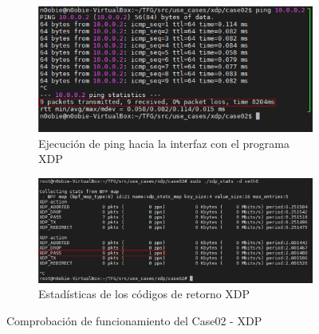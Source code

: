 \begin{figure}[h!]
    \centering
    \begin{subfigure}[b]{\textwidth}
    	\centering
        \includegraphics[width=11cm]{archivos/img/dev/xdp/case02/demo_case02_3_edited.png}
        \caption{Ejecución de ping hacia la interfaz con el programa XDP}
        \label{fig:case02_xdp_ether_func_ping}
    \end{subfigure}
    \par\bigskip
    \begin{subfigure}[b]{\textwidth}
    	\centering
    \includegraphics[width=14cm]{archivos/img/dev/xdp/case02/demo_case02_4_edited.png}
        \caption{Estadísticas de los códigos de retorno XDP}
        \label{fig:case02_xdp_ether_func_stats}
    \end{subfigure}
    \caption{Comprobación de funcionamiento del Case02 - XDP}
    \label{fig:case02_xdp_ether_func}
\end{figure}


